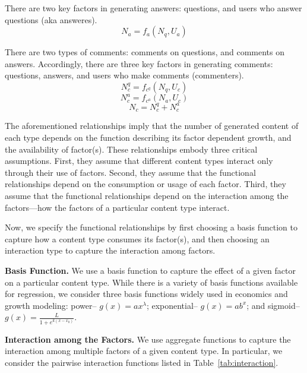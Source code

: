 There are two key factors in generating answers: questions, and users who answer questions (aka answeres). 
\begin{equation*}
N_a = f_a(N_q, U_a)
\end{equation*}

There are two types of comments: comments on questions, and comments on answers. Accordingly, there are three key factors in generating comments: questions, answers, and users who make comments (commenters). 
\begin{equation*}
N_c^q = f_{c^q}(N_q, U_c)
\end{equation*}
\begin{equation*}
N_c^a = f_{c^a}(N_a, U_c)
\end{equation*}
\begin{equation*}
N_c = N_c^q + N_c^a
\end{equation*}

The aforementioned relationships imply that the number of generated content of each type depends on the function describing its factor dependent growth, and the availability of factor(s). These relationships embody three critical assumptions. First, they assume that different content types interact only through their use of factors. Second, they assume that the functional relationships depend on the consumption or usage of each factor. Third, they assume that the functional relationships depend on the interaction among the factors---how the factors of a particular content type interact. 

Now, we specify the functional relationships by first choosing a basis function to capture how a content type consumes its factor(s), and then choosing an interaction type to capture the interaction among factors.

\textbf{Basis Function.} We use a basis function to capture the effect of a given factor on a particular content type. While there is a variety of basis functions available for regression, we consider three basis functions widely used in economics and growth modeling: power-- $g(x) = ax^{\lambda}$; exponential-- $g(x) = ab^x$; and sigmoid-- $g(x) = \frac{L}{1+e^{k(x-x_0)}}$. 

\textbf{Interaction among the Factors.} We use aggregate functions to capture the interaction among multiple factors of a given content type. In particular, we consider the pairwise interaction functions listed in Table~\ref{tab:interaction}. 

